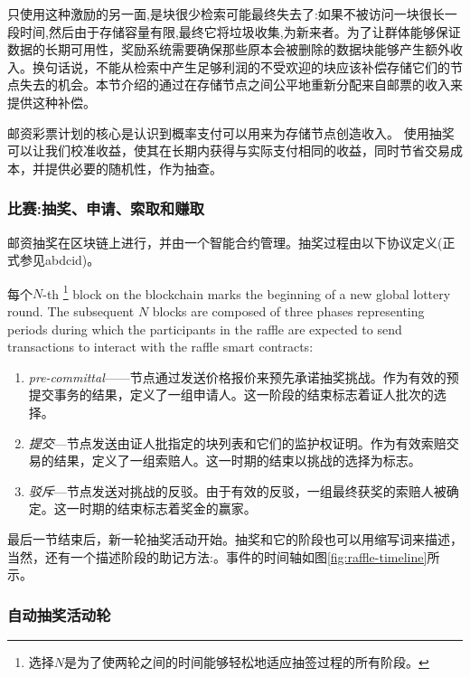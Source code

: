 只使用这种激励的另一面,是块很少检索可能最终失去了:如果不被访问一块很长一段时间,然后由于存储容量有限,最终它将垃圾收集,为新来者。为了让群体能够保证数据的长期可用性，奖励系统需要确保那些原本会被删除的数据块能够产生额外收入。换句话说，不能从检索中产生足够利润的不受欢迎的块应该补偿存储它们的节点失去的机会。本节介绍的通过在存储节点之间公平地重新分配来自邮票的收入来提供这种补偿。



邮资彩票计划的核心是认识到概率支付可以用来为存储节点创造收入。
使用抽奖可以让我们校准收益，使其在长期内获得与实际支付相同的收益，同时节省交易成本，并提供必要的随机性，作为抽查。


\subsubsection{比赛:抽奖、申请、索取和赚取}

邮资抽奖在区块链上进行，并由一个智能合约管理。抽奖过程由以下协议定义(正式参见abdcid)。

每个$N$-th %
%
\footnote{选择$N$是为了使两轮之间的时间能够轻松地适应抽签过程的所有阶段。}
%
block on the blockchain marks the beginning of a new global lottery round.
The subsequent $N$ blocks are composed of three phases representing periods during which the participants in the raffle are expected to send transactions to interact with the raffle smart contracts: 

\begin{enumerate}
\item \emph{pre-committal}——节点通过发送价格报价来预先承诺抽奖挑战。作为有效的预提交事务的结果，定义了一组申请人。这一阶段的结束标志着证人批次的选择。
\item \emph{提交}—节点发送由证人批指定的块列表和它们的监护权证明。作为有效索赔交易的结果，定义了一组索赔人。这一时期的结束以挑战的选择为标志。
\item \emph{驳斥}—节点发送对挑战的反驳。由于有效的反驳，一组最终获奖的索赔人被确定。这一时期的结束标志着奖金的赢家。
\end{enumerate}

最后一节结束后，新一轮抽奖活动开始。抽奖和它的阶段也可以用缩写词来描述，当然，还有一个描述阶段的助记方法:。事件的时间轴如图\ref{fig:raffle-timeline}所示。


\subsubsection{自动抽奖活动轮}

